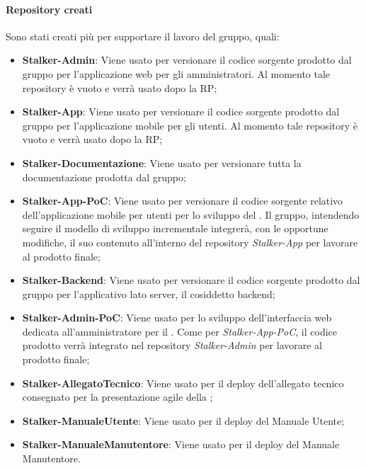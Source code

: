 \paragraph{Repository creati}
Sono stati creati più  per supportare il lavoro del gruppo, quali:
\begin{itemize}
	\item \textbf{Stalker-Admin}: Viene usato per versionare il codice sorgente prodotto dal gruppo per l'applicazione web per gli amministratori. Al momento tale repository è vuoto e verrà usato dopo la RP;
	\item \textbf{Stalker-App}: Viene usato per versionare il codice sorgente prodotto dal gruppo per l'applicazione mobile per gli utenti. Al momento tale repository è vuoto e verrà usato dopo la RP;
	\item \textbf{Stalker-Documentazione}: Viene usato per versionare tutta la documentazione prodotta dal gruppo;
	\item \textbf{Stalker-App-PoC}: Viene usato per versionare il codice sorgente relativo dell'applicazione mobile per utenti per lo sviluppo del .
	Il gruppo, intendendo seguire il modello di sviluppo incrementale integrerà, con le opportune modifiche, il suo contenuto all'interno del repository \textit{Stalker-App} per lavorare al prodotto finale;
	\item \textbf{Stalker-Backend}: Viene usato per versionare il codice sorgente prodotto dal gruppo per l'applicativo lato server, il cosiddetto backend;
	\item \textbf{Stalker-Admin-PoC}: Viene usato per lo sviluppo dell'interfaccia web dedicata all'amministratore per il .
	Come per \textit{Stalker-App-PoC}, il codice prodotto verrà integrato nel repository \textit{Stalker-Admin} per lavorare al prodotto finale;
	\item \textbf{Stalker-AllegatoTecnico}: Viene usato per il deploy dell'allegato tecnico consegnato per la presentazione agile della ;
	\item \textbf{Stalker-ManualeUtente}: Viene usato per il deploy del Manuale Utente;
	\item \textbf{Stalker-ManualeManutentore}: Viene usato per il deploy del Manuale Manutentore.
\end{itemize}

